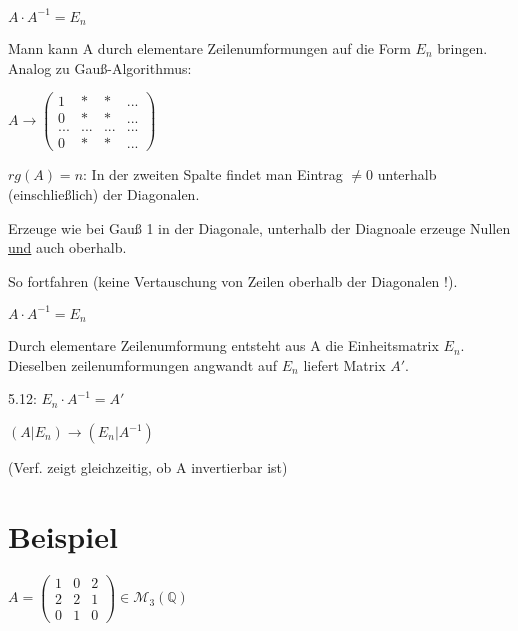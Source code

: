 \documentclass[a4paper, openany]{book}
\begin{document}
        \begin{center}
          $A  \cdot A^{-1} = E_n$
        \end{center}

        Mann kann A durch elementare Zeilenumformungen auf die Form $E_n$ bringen. Analog zu Gauß-Algorithmus:

        \begin{center}
          $A \longrightarrow \begin{pmatrix}1 & * & * & ... \\ 0 & * & * & ... \\ ... & ... & ... & ... \\ 0 & * & * & ... \end{pmatrix}$
        \end{center}

        $rg(A) = n$: In der zweiten Spalte findet man Eintrag $\neq 0$ unterhalb (einschließlich) der Diagonalen.

        Erzeuge wie bei Gauß 1 in der Diagonale, unterhalb der Diagnoale erzeuge Nullen \underline{und} auch oberhalb.

        So fortfahren (keine Vertauschung von Zeilen oberhalb der Diagonalen !).

        \begin{center}
          $A \cdot A^{-1} = E_n$
        \end{center}

        Durch elementare Zeilenumformung entsteht aus A die Einheitsmatrix $E_n$. Dieselben zeilenumformungen angwandt auf $E_n$ liefert Matrix $A'$.

        \par \medskip

        5.12: $E_n \cdot A^{-1} = A'$

        \begin{center}
          $(A | E_n) \longrightarrow (E_n|A^{-1})$
        \end{center}

        (Verf. zeigt gleichzeitig, ob A invertierbar ist)

        \section{Beispiel}

        $A = \begin{pmatrix}1 & 0 & 2 \\ 2 & 2 & 1 \\ 0 & 1 & 0 \end{pmatrix} \in \mathcal{M}_3(\mathbb{Q})$
\end{document}
